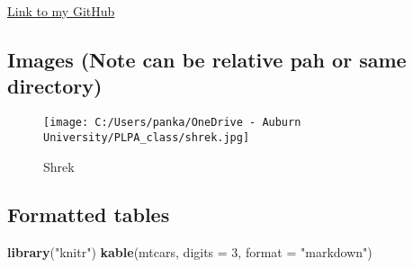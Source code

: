 \documentclass[
]{article}
\newenvironment{Shaded}{\begin{snugshade}}{\end{snugshade}}
\newcommand{\AttributeTok}[1]{\textcolor[rgb]{0.13,0.29,0.53}{#1}}
\newcommand{\DecValTok}[1]{\textcolor[rgb]{0.00,0.00,0.81}{#1}}
\newcommand{\FunctionTok}[1]{\textcolor[rgb]{0.13,0.29,0.53}{\textbf{#1}}}
\newcommand{\NormalTok}[1]{#1}
\newcommand{\StringTok}[1]{\textcolor[rgb]{0.31,0.60,0.02}{#1}}
\begin{document}
\href{https://github.com/ppg0001/PLPA_Assignment}{Link to my GitHub}

\subsection{Images (Note can be relative pah or same
directory)}\label{images-note-can-be-relative-pah-or-same-directory}

\begin{figure}
\centering
\texttt{[image: C:/Users/panka/OneDrive - Auburn University/PLPA\_class/shrek.jpg]}
\caption{Shrek}
\end{figure}

\subsection{Formatted tables}\label{formatted-tables}

\begin{Shaded}
\begin{Highlighting}[]
\FunctionTok{library}\NormalTok{(}\StringTok{"knitr"}\NormalTok{)}
\FunctionTok{kable}\NormalTok{(mtcars, }\AttributeTok{digits =} \DecValTok{3}\NormalTok{, }\AttributeTok{format =} \StringTok{"markdown"}\NormalTok{)}
\end{Highlighting}
\end{Shaded}
\end{document}
